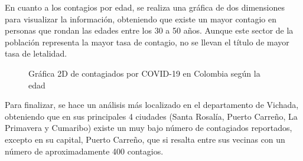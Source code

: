 \documentclass[conference,compsoc,onecolumn]{IEEEtran}
\begin{document}
En cuanto a los contagios por edad, se realiza una gráfica de dos dimensiones para visualizar la información, obteniendo que existe un mayor contagio en personas que rondan las edades entre los 30 a 50 años. Aunque este sector de la población representa la mayor tasa de contagio, no se llevan el título de mayor tasa de letalidad.


\begin{figure}[htbp]
\centering
{}
\caption{Gráfica 2D de contagiados por COVID-19 en Colombia según la edad} 
\label{fig:lego}
\end{figure}

Para finalizar, se hace un análisis más localizado en el departamento de Vichada, obteniendo que en sus principales 4 ciudades (Santa Rosalía, Puerto Carreño, La Primavera y Cumaribo) existe un muy bajo número de contagiados reportados, excepto en su capital, Puerto Carreño, que si resalta entre sus vecinas con un número de aproximadamente 400 contagios.  
\end{document}
